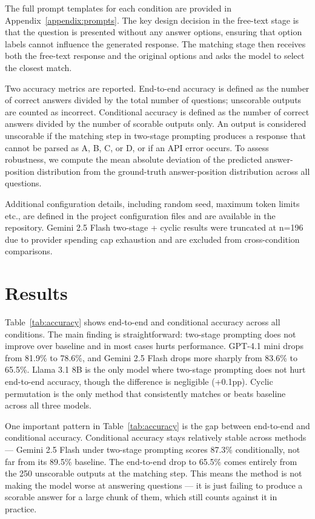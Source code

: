 \documentclass{article}
\begin{document}
The full prompt templates for each condition are provided in Appendix~\ref{appendix:prompts}. The key design decision in the free-text stage is that the question is presented without any answer options, ensuring that option labels cannot influence the generated response. The matching stage then receives both the free-text response and the original options and asks the model to select the closest match.

Two accuracy metrics are reported. End-to-end accuracy is defined as the number of correct answers divided by the total number of questions; unscorable outputs are counted as incorrect. Conditional accuracy is defined as the number of correct answers divided by the number of scorable outputs only. An output is considered unscorable if the matching step in two-stage prompting produces a response that cannot be parsed as A, B, C, or D, or if an API error occurs. To assess robustness, we compute the mean absolute deviation of the predicted answer-position distribution from the ground-truth answer-position distribution across all questions.
 
Additional configuration details, including random seed, maximum token limits etc., are defined in the project configuration files and are available in the repository. Gemini 2.5 Flash two-stage + cyclic results were truncated at n=196 due to provider spending cap exhaustion and are excluded from cross-condition comparisons.
 
\section{Results}

Table~\ref{tab:accuracy} shows end-to-end and conditional accuracy across all conditions. The main finding is straightforward: two-stage prompting does not improve over baseline and in most cases hurts performance. GPT-4.1 mini drops from 81.9\% to 78.6\%, and Gemini 2.5 Flash drops more sharply from 83.6\% to 65.5\%. Llama 3.1 8B is the only model where two-stage prompting does not hurt end-to-end accuracy, though the difference is negligible (+0.1pp). Cyclic permutation is the only method that consistently matches or beats baseline across all three models.

One important pattern in Table~\ref{tab:accuracy} is the gap between end-to-end and conditional accuracy. Conditional accuracy stays relatively stable across methods --- Gemini 2.5 Flash under two-stage prompting scores 87.3\% conditionally, not far from its 89.5\% baseline. The end-to-end drop to 65.5\% comes entirely from the 250 unscorable outputs at the matching step. This means the method is not making the model worse at answering questions --- it is just failing to produce a scorable answer for a large chunk of them, which still counts against it in practice.
\end{document}
